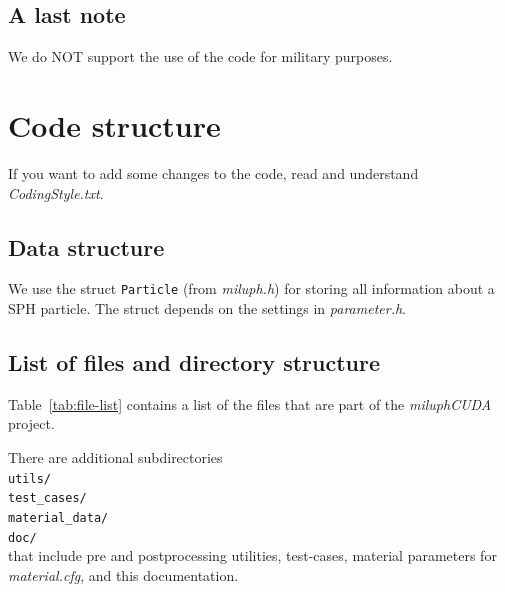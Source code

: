 \documentclass[10pt,fleqn,twoside]{article}
\begin{document}
\subsection{A last note}
We do NOT support the use of the code for military purposes.




\section{Code structure}
If you want to add some changes to the code, read and understand \emph{CodingStyle.txt}.

\subsection{Data structure}
We use the struct \verb|Particle| (from \emph{miluph.h}) for storing all information about a SPH particle. The struct depends on the
settings in \emph{parameter.h}.

\subsection{List of files and directory structure}
Table~\ref{tab:file-list} contains a list of the files that are part of the \emph{miluphCUDA} project.

There are additional subdirectories\\
\verb|utils/|\\
\verb|test_cases/|\\
\verb|material_data/|\\
\verb|doc/|\\
that include pre and postprocessing utilities, test-cases, material parameters for \emph{material.cfg}, and this documentation.
\end{document}
